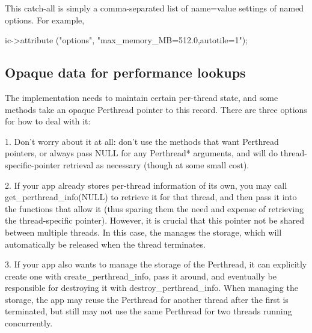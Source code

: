 This catch-all is simply a comma-separated list of {\cf name=value}
settings of named options.  For example,
\begin{code}
        ic->attribute ("options", "max_memory_MB=512.0,autotile=1");
\end{code}
\apiend

\bigskip

\subsection{Opaque data for performance lookups}
\label{sec:imagecache:api:opaque}

 
\NEW %

The \ImageCache implementation needs to maintain certain per-thread
state, and some \ImageCache methods take an opaque {\cf Perthread} pointer
to this record. There are three options for how to deal with it:

1. Don't worry about it at all: don't use the methods that want {\cf
Perthread} pointers, or always pass {\cf NULL} for any {\cf Perthread*}
arguments, and \ImageCache will do thread-specific-pointer retrieval as
necessary (though at some small cost).

2. If your app already stores per-thread information of its own, you may
call {\cf get_perthread_info(NULL)} to retrieve it for that thread, and then
pass it into the functions that allow it (thus sparing them the need and
expense of retrieving the thread-specific pointer). However, it is crucial
that this pointer not be shared between multiple threads. In this case,
the \ImageCache manages the storage, which will automatically be released
when the thread terminates.

3. If your app also wants to manage the storage of the {\cf Perthread},
it can explicitly create one with {\cf create_perthread_info}, pass it around,
and eventually be responsible for destroying it with {\cf destroy_perthread_info}.
When managing the storage, the app may reuse the {\cf Perthread} for another
thread after the first is terminated, but still may not use the same
{\cf Perthread} for two threads running concurrently.
\apiend


